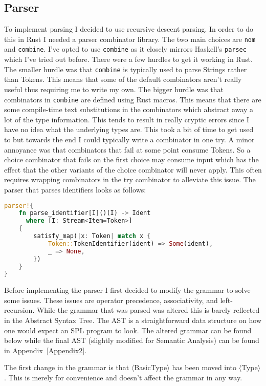 \documentclass{article}
\begin{document}
\subsection{Parser}
To implement parsing I decided to use recursive descent parsing. In order to do this in Rust I needed a parser combinator library. The two main choices are \texttt{nom} and \texttt{combine}. I've opted to use \texttt{combine} as it closely mirrors Haskell's \texttt{parsec} which I've tried out before. There were a few hurdles to get it working in Rust. The smaller hurdle was that \texttt{combine} is typically used to parse Strings rather than Tokens. This means that some of the default combinators aren't really useful thus requiring me to write my own. The bigger hurdle was that combinators in \texttt{combine} are defined using Rust macros. This means that there are some compile-time text substitutions in the combinators which abstract away a lot of the type information. This tends to result in really cryptic errors since I have no idea what the underlying types are. This took a bit of time to get used to but towards the end I could typically write a combinator in one try. A minor annoyance was that combinators that fail at some point consume Tokens. So a choice combinator that fails on the first choice may consume input which has the effect that the other variants of the choice combinator will never apply. This often requires wrapping combinators in the try combinator to alleviate this issue. The parser that parses identifiers looks as follows:
\begin{lstlisting}[language=Rust, style=boxed]
parser!{
	fn parse_identifier[I]()(I) -> Ident
	  where [I: Stream<Item=Token>]
	{
		satisfy_map(|x: Token| match x {
			Token::TokenIdentifier(ident) => Some(ident),
			_ => None,
		})
	}
}
\end{lstlisting}

Before implementing the parser I first decided to modify the grammar to solve some issues. These issues are operator precedence, associativity, and left-recursion. While the grammar that was parsed was altered this is barely reflected in the Abstract Syntax Tree. The AST is a straightforward data structure on how one would expect an SPL program to look. The altered grammar can be found below while the final AST (slightly modified for Semantic Analysis) can be found in Appendix~\ref{Appendix2}.

The first change in the grammar is that $\langle$BasicType$\rangle$ has been moved into $\langle$Type$\rangle$. This is merely for convenience and doesn't affect the grammar in any way.
\end{document}
